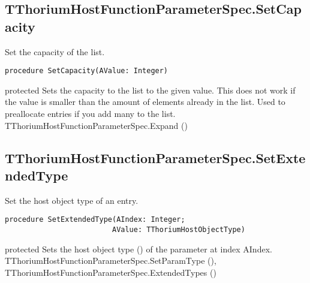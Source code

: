 \subsection{TThoriumHostFunctionParameterSpec.SetCapacity}
\label{thoriumcorepkg:thorium:tthoriumhostfunctionparameterspec:setcapacity}
\begin{FPCList}
\Synopsis
Set the capacity of the list.\Declaration 

\begin{verbatim}
procedure SetCapacity(AValue: Integer)
\end{verbatim}
\Visibility
protected
\Description
Sets the capacity to the list to the given value. This does not work if the value is smaller than the amount of elements already in the list. Used to preallocate entries if you add many to the list.\SeeAlso
TThoriumHostFunctionParameterSpec.Expand (\pageref{thoriumcorepkg:thorium:tthoriumhostfunctionparameterspec:expand})\end{FPCList}
\subsection{TThoriumHostFunctionParameterSpec.SetExtendedType}
\label{thoriumcorepkg:thorium:tthoriumhostfunctionparameterspec:setextendedtype}
\begin{FPCList}
\Synopsis
Set the host object type of an entry.\Declaration 

\begin{verbatim}
procedure SetExtendedType(AIndex: Integer;
                         AValue: TThoriumHostObjectType)
\end{verbatim}
\Visibility
protected
\Description
Sets the host object type (\pageref{thoriumcorepkg:thorium:tthoriumhostobjecttype}) of the parameter at index AIndex.\SeeAlso
TThoriumHostFunctionParameterSpec.SetParamType (\pageref{thoriumcorepkg:thorium:tthoriumhostfunctionparameterspec:setparamtype}),
TThoriumHostFunctionParameterSpec.ExtendedTypes (\pageref{thoriumcorepkg:thorium:tthoriumhostfunctionparameterspec:extendedtypes})\end{FPCList}
